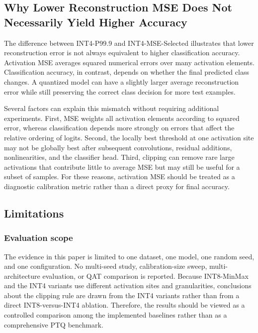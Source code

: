 \subsection{Why Lower Reconstruction MSE Does Not Necessarily Yield Higher Accuracy}
\label{subsec:mse_accuracy_mismatch}

The difference between INT4-P99.9 and INT4-MSE-Selected illustrates that lower reconstruction error is not always equivalent to higher classification accuracy. Activation MSE averages squared numerical errors over many activation elements. Classification accuracy, in contrast, depends on whether the final predicted class changes. A quantized model can have a slightly larger average reconstruction error while still preserving the correct class decision for more test examples.

Several factors can explain this mismatch without requiring additional experiments. First, MSE weights all activation elements according to squared error, whereas classification depends more strongly on errors that affect the relative ordering of logits. Second, the locally best threshold at one activation site may not be globally best after subsequent convolutions, residual additions, nonlinearities, and the classifier head. Third, clipping can remove rare large activations that contribute little to average MSE but may still be useful for a subset of samples. For these reasons, activation MSE should be treated as a diagnostic calibration metric rather than a direct proxy for final accuracy.

\subsection{Limitations}
\label{subsec:results_limitations}

\subsubsection{Evaluation scope}
The evidence in this paper is limited to one dataset, one model, one random seed, and one configuration. No multi-seed study, calibration-size sweep, multi-architecture evaluation, or QAT comparison is reported. Because INT8-MinMax and the INT4 variants use different activation sites and granularities, conclusions about the clipping rule are drawn from the INT4 variants rather than from a direct INT8-versus-INT4 ablation. Therefore, the results should be viewed as a controlled comparison among the implemented baselines rather than as a comprehensive PTQ benchmark.

